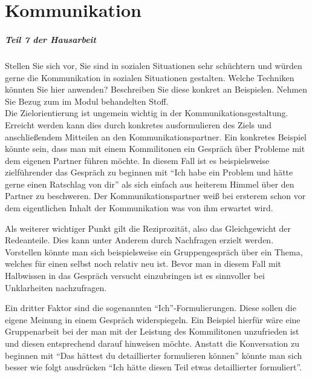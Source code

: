 %
\chapter{Kommunikation}
\label{sec:kommunikation}

\paragraph{Teil 7 der Hausarbeit}
Stellen Sie sich vor, Sie sind in sozialen Situationen sehr schüchtern und würden gerne die Kommunikation in sozialen Situationen gestalten. Welche Techniken könnten Sie hier anwenden? Beschreiben Sie diese konkret an Beispielen. Nehmen Sie Bezug zum im Modul behandelten Stoff. \\[0.4em]

Die Zielorientierung ist ungemein wichtig in der Kommunikationsgestaltung. Erreicht werden kann dies durch konkretes ausformulieren des Ziels und anschließendem Mitteilen an den Kommunikationspartner. Ein konkretes Beispiel könnte sein, dass man mit einem Kommilitonen ein Gespräch über Probleme mit dem eigenen Partner führen möchte.
In diesem Fall ist es beispielsweise zielführender das Gespräch zu beginnen mit “Ich habe ein Problem und hätte gerne einen Ratschlag von dir” als sich einfach aus heiterem Himmel über den Partner zu beschweren. Der Kommunikationspartner weiß bei ersterem schon vor dem eigentlichen Inhalt der Kommunikation was von ihm erwartet wird.

Als weiterer wichtiger Punkt gilt die Reziprozität, also das Gleichgewicht der Redeanteile. Dies kann unter Anderem durch Nachfragen erzielt werden.
Vorstellen könnte man sich beispielsweise ein Gruppengespräch über ein Thema, welches für einen selbst noch relativ neu ist. Bevor man in diesem Fall mit Halbwissen in das Gespräch versucht einzubringen ist es sinnvoller bei Unklarheiten nachzufragen.

Ein dritter Faktor sind die sogenannten “Ich”-Formulierungen. Diese sollen die eigene Meinung in einem Gespräch widerspiegeln. Ein Beispiel hierfür wäre eine Gruppenarbeit bei der man mit der Leistung des Kommilitonen unzufrieden ist und diesen entsprechend darauf hinweisen möchte. Anstatt die Konversation zu beginnen mit “Das hättest du detaillierter formulieren können” könnte man sich besser wie folgt ausdrücken “Ich hätte diesen Teil etwas detaillierter formuliert”.
